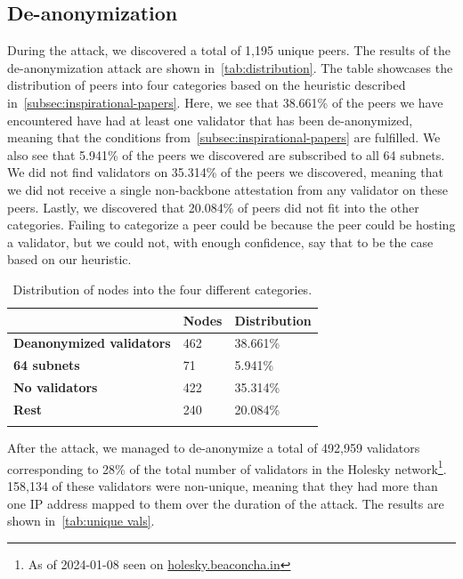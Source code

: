 \subsection{De-anonymization}\label{subsec:de-anonymization}
During the attack, we discovered a total of 1,195 unique peers.
The results of the de-anonymization attack are shown in~\autoref{tab:distribution}.
The table showcases the distribution of peers into four categories based on the heuristic described in~\autoref{subsec:inspirational-papers}.
Here, we see that 38.661\% of the peers we have encountered have had at least one validator that has been de-anonymized, meaning that the conditions from~\autoref{subsec:inspirational-papers} are fulfilled.
We also see that 5.941\% of the peers we discovered are subscribed to all 64 subnets.
We did not find validators on 35.314\% of the peers we discovered, meaning that we did not receive a single non-backbone attestation from any validator on these peers.
Lastly, we discovered that 20.084\% of peers did not fit into the other categories.
Failing to categorize a peer could be because the peer could be hosting a validator, but we could not, with enough confidence, say that to be the case based on our heuristic.


\begin{table}[]
    \centering
    \caption{Distribution of nodes into the four different categories.}
    \begin{tabular}{lll}
        \hline
        & \textbf{Nodes} & \textbf{Distribution} \\ \hline
        \textbf{Deanonymized validators} & 462            & 38.661\%                 \\
        \textbf{64 subnets}              & 71             & 5.941\%                  \\
        \textbf{No validators}           & 422              & 35.314\%               \\
        \textbf{Rest}                    & 240            & 20.084\%                 \\ \hline
        \\
    \end{tabular}
    \label{tab:distribution}
\end{table}


After the attack, we managed to de-anonymize a total of 492,959 validators corresponding to 28\% of the total number of validators in the Holesky network\footnote{As of 2024-01-08 seen on \href{https://holesky.beaconcha.in/}{holesky.beaconcha.in}}.
158,134 of these validators were non-unique, meaning that they had more than one IP address mapped to them over the duration of the attack.
The results are shown in~\autoref{tab:unique vals}.

